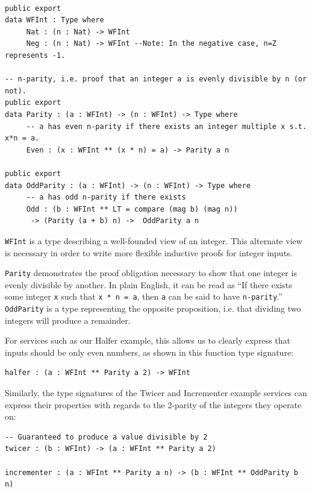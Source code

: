 \documentclass[]{report}
\begin{document}
\begin{verbatim}

public export
data WFInt : Type where
     Nat : (n : Nat) -> WFInt
     Neg : (n : Nat) -> WFInt --Note: In the negative case, n=Z represents -1.

-- n-parity, i.e. proof that an integer a is evenly divisible by n (or not).
public export
data Parity : (a : WFInt) -> (n : WFInt) -> Type where
     -- a has even n-parity if there exists an integer multiple x s.t. x*n = a.
     Even : (x : WFInt ** (x * n) = a) -> Parity a n

public export
data OddParity : (a : WFInt) -> (n : WFInt) -> Type where
     -- a has odd n-parity if there exists
     Odd : (b : WFInt ** LT = compare (mag b) (mag n))
      -> (Parity (a + b) n) ->  OddParity a n

\end{verbatim}

\texttt{WFInt} is a type describing a well-founded view of an integer.  This
alternate view is necessary in order to write more flexible inductive proofs for
integer inputs.

\texttt{Parity} demonstrates the proof obligation necessary to
show that one integer is evenly divisible by another.  In plain English, it can
be read as ``If there exists some integer \texttt{x} such that
\texttt{x * n = a}, then \texttt{a} can be said to have \texttt{n-parity}.''
\texttt{OddParity} is a type representing the opposite proposition, i.e. that
dividing two integers will produce a remainder.

For services such as our Halfer example, this allows us to clearly express that
inputs should be only even numbers, as shown in this function type signature:

\begin{verbatim}
halfer : (a : WFInt ** Parity a 2) -> WFInt
\end{verbatim}

Similarly, the type signatures of the Twicer and Incrementer example services
can express their properties with regards to the 2-parity of the integers they
operate on:

\begin{verbatim}
-- Guaranteed to produce a value divisible by 2
twicer : (b : WFInt) -> (a : WFInt ** Parity a 2)

incrementer : (a : WFInt ** Parity a n) -> (b : WFInt ** OddParity b n)
\end{verbatim}
\end{document}
